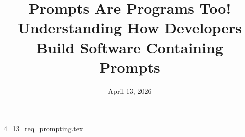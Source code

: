\documentclass{article}      %
\title{Prompts Are Programs Too! Understanding How Developers Build Software Containing Prompts}  %
\date{April 13, 2026}
\begin{document}

\maketitle                   %



{4_13_req_prompting.tex}
\printbibliography
\end{document}
